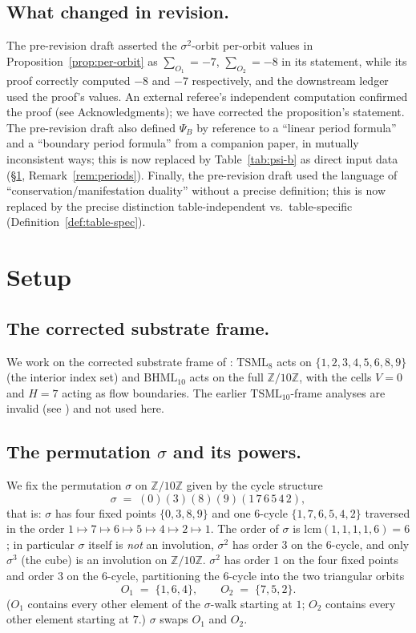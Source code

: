 \documentclass[11pt,reqno]{amsart}
\theoremstyle{plain}
\theoremstyle{definition}
\theoremstyle{remark}
\newcommand{\Z}{\mathbb{Z}}
\newcommand{\TS}{\mathrm{TSML}}
\newcommand{\BH}{\mathrm{BHML}}
\newcommand{\sig}{\sigma}
\begin{document}
\subsection{What changed in revision.}
The pre-revision draft asserted the $\sig^{2}$-orbit per-orbit values
in Proposition~\ref{prop:per-orbit} as $\sum_{O_1} = -7$, $\sum_{O_2} =
-8$ in its statement, while its proof correctly computed $-8$ and $-7$
respectively, and the downstream ledger used the proof's values.
An external referee's independent computation confirmed the proof
(see Acknowledgments); we have corrected the proposition's statement.
The pre-revision draft also defined $\Psi_B$ by reference to a
``linear period formula'' and a ``boundary period formula'' from a
companion paper, in mutually inconsistent ways; this is now replaced
by Table~\ref{tab:psi-b} as direct input data
(\S\ref{sec:setup}, Remark~\ref{rem:periods}).
Finally, the pre-revision draft used the language of
``conservation/manifestation duality'' without a precise definition;
this is now replaced by the precise distinction
table-independent vs.\ table-specific
(Definition~\ref{def:table-spec}).

\section{Setup}
\label{sec:setup}

\subsection{The corrected substrate frame.}
We work on the corrected substrate frame of
\cite{SandersGishFourCore, SandersBridgeWP9}: $\TS_{8}$ acts on
$\{1, 2, 3, 4, 5, 6, 8, 9\}$ (the interior index set) and $\BH_{10}$
acts on the full $\Z/10\Z$, with the cells $V = 0$ and $H = 7$ acting
as flow boundaries.  The earlier $\TS_{10}$-frame analyses are invalid
(see \cite[N10]{SandersBridgeWP9}) and not used here.

\subsection{The permutation $\sig$ and its powers.}
We fix the permutation $\sig$ on $\Z/10\Z$ given by the cycle structure
\[
\sig \;=\; (0)(3)(8)(9)(1\,7\,6\,5\,4\,2),
\]
that is: $\sig$ has four fixed points $\{0, 3, 8, 9\}$ and one
$6$-cycle $\{1, 7, 6, 5, 4, 2\}$ traversed in the order
$1 \mapsto 7 \mapsto 6 \mapsto 5 \mapsto 4 \mapsto 2 \mapsto 1$.
The order of $\sig$ is $\mathrm{lcm}(1, 1, 1, 1, 6) = 6$; in particular
$\sig$ itself is \emph{not} an involution, $\sig^{2}$ has order $3$ on
the $6$-cycle, and only $\sig^{3}$ (the cube) is an involution on
$\Z/10\Z$.
$\sig^{2}$ has order $1$ on the four fixed points and order $3$ on the
$6$-cycle, partitioning the $6$-cycle into the two triangular orbits
\[
O_{1} \;=\; \{1, 6, 4\},
\qquad O_{2} \;=\; \{7, 5, 2\}.
\]
($O_{1}$ contains every other element of the $\sig$-walk starting at
$1$; $O_{2}$ contains every other element starting at $7$.)
$\sig$ swaps $O_1$ and $O_2$.
\end{document}
